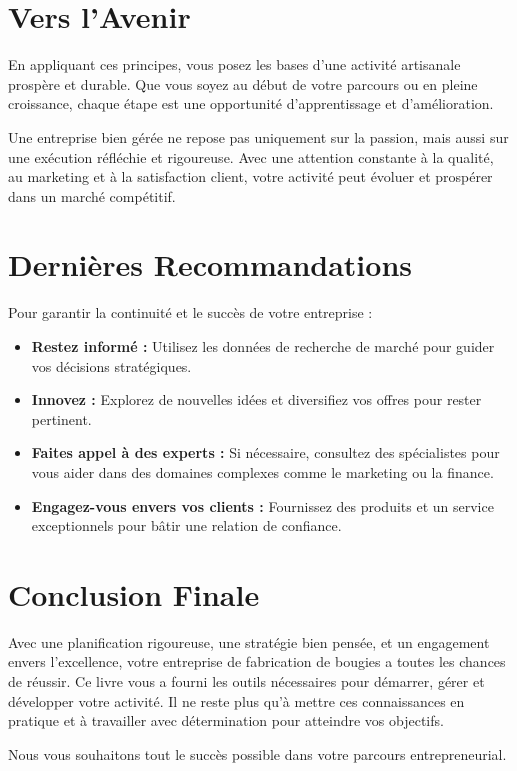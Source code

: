 \documentclass[11pt,fleqn,onecolumn,oneside]{book}
\begin{document}
\section*{Vers l’Avenir}

En appliquant ces principes, vous posez les bases d’une activité artisanale prospère et durable. Que vous soyez au début de votre parcours ou en pleine croissance, chaque étape est une opportunité d’apprentissage et d’amélioration.

\begin{corollary}
Une entreprise bien gérée ne repose pas uniquement sur la passion, mais aussi sur une exécution réfléchie et rigoureuse. Avec une attention constante à la qualité, au marketing et à la satisfaction client, votre activité peut évoluer et prospérer dans un marché compétitif.
\end{corollary}

\section*{Dernières Recommandations}

Pour garantir la continuité et le succès de votre entreprise :
\begin{itemize}
    \item \textbf{Restez informé :} Utilisez les données de recherche de marché pour guider vos décisions stratégiques.
    \item \textbf{Innovez :} Explorez de nouvelles idées et diversifiez vos offres pour rester pertinent.
    \item \textbf{Faites appel à des experts :} Si nécessaire, consultez des spécialistes pour vous aider dans des domaines complexes comme le marketing ou la finance.
    \item \textbf{Engagez-vous envers vos clients :} Fournissez des produits et un service exceptionnels pour bâtir une relation de confiance.
\end{itemize}

\section*{Conclusion Finale}

Avec une planification rigoureuse, une stratégie bien pensée, et un engagement envers l’excellence, votre entreprise de fabrication de bougies a toutes les chances de réussir. Ce livre vous a fourni les outils nécessaires pour démarrer, gérer et développer votre activité. Il ne reste plus qu’à mettre ces connaissances en pratique et à travailler avec détermination pour atteindre vos objectifs.

Nous vous souhaitons tout le succès possible dans votre parcours entrepreneurial.
\end{document}
